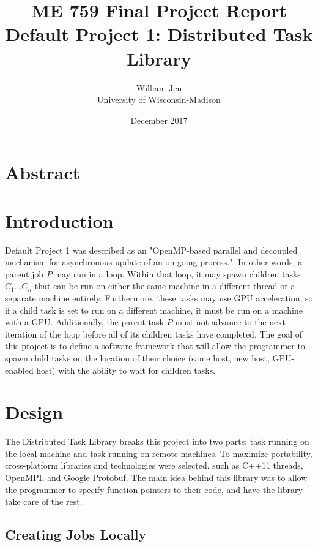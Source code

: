 \documentclass[11pt]{article}
\title{\vspace{10em}ME 759 Final Project Report \\ Default Project 1: Distributed Task Library}
\author{William Jen \\ University of Wisconsin-Madison}
\date{December 2017}
\begin{document}
    \maketitle

    \pagebreak
    \section{Abstract}
    
    \pagebreak
    \tableofcontents
    \pagebreak
    
    \section{Introduction}
        Default Project 1 was described as an "OpenMP-based parallel and decoupled mechanism for
        asynchronous update of an on-going process.". In other words, a parent job $P$ may run in 
        a loop. Within that loop, it may spawn children tasks $C_1 \ldots C_n$ that can be run on either
        the same machine in a different thread or a separate machine entirely. Furthermore, these tasks may
        use GPU acceleration, so if a child task is set to run on a different machine, it must be run on a 
        machine with a GPU. Additionally, the parent task $P$ must not advance to the next iteration of the loop
        before all of its children tasks have completed. The goal of this project is to define a software framework 
        that will allow the programmer to spawn child tasks on the location of their choice (same host, new host, 
        GPU-enabled host) with the ability to wait for children tasks.
    
    \section{Design}
        The Distributed Task Library breaks this project into two parts: task running on the local machine and 
        task running on remote machines. To maximize portability, cross-platform libraries and technologies 
        were selected, such as C++11 threads, OpenMPI, and Google Protobuf. The main idea behind this library
        was to allow the programmer to specify function pointers to their code, and have the library take care of
        the rest. 

        \subsection{Creating Jobs Locally}
\end{document}
